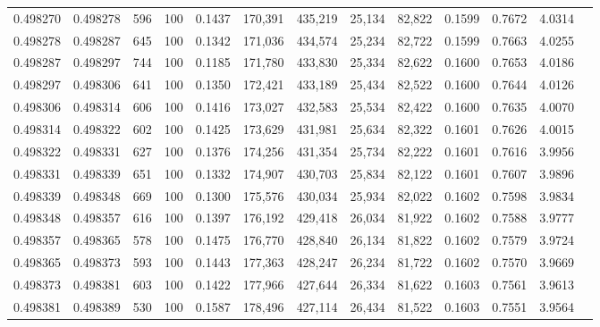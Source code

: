 \begin{tabular}{rrrrrrrrrrrrr}
0.498270 & 0.498278 &   596 & 100 &                                     0.1437 & 170,391 & 435,219 &  25,134 &  82,822 & 0.1599 & 0.7672 & 4.0314 \\
0.498278 & 0.498287 &   645 & 100 &                                     0.1342 & 171,036 & 434,574 &  25,234 &  82,722 & 0.1599 & 0.7663 & 4.0255 \\
0.498287 & 0.498297 &   744 & 100 &                                     0.1185 & 171,780 & 433,830 &  25,334 &  82,622 & 0.1600 & 0.7653 & 4.0186 \\
0.498297 & 0.498306 &   641 & 100 &                                     0.1350 & 172,421 & 433,189 &  25,434 &  82,522 & 0.1600 & 0.7644 & 4.0126 \\
0.498306 & 0.498314 &   606 & 100 &                                     0.1416 & 173,027 & 432,583 &  25,534 &  82,422 & 0.1600 & 0.7635 & 4.0070 \\
0.498314 & 0.498322 &   602 & 100 &                                     0.1425 & 173,629 & 431,981 &  25,634 &  82,322 & 0.1601 & 0.7626 & 4.0015 \\
0.498322 & 0.498331 &   627 & 100 &                                     0.1376 & 174,256 & 431,354 &  25,734 &  82,222 & 0.1601 & 0.7616 & 3.9956 \\
0.498331 & 0.498339 &   651 & 100 &                                     0.1332 & 174,907 & 430,703 &  25,834 &  82,122 & 0.1601 & 0.7607 & 3.9896 \\
0.498339 & 0.498348 &   669 & 100 &                                     0.1300 & 175,576 & 430,034 &  25,934 &  82,022 & 0.1602 & 0.7598 & 3.9834 \\
0.498348 & 0.498357 &   616 & 100 &                                     0.1397 & 176,192 & 429,418 &  26,034 &  81,922 & 0.1602 & 0.7588 & 3.9777 \\
0.498357 & 0.498365 &   578 & 100 &                                     0.1475 & 176,770 & 428,840 &  26,134 &  81,822 & 0.1602 & 0.7579 & 3.9724 \\
0.498365 & 0.498373 &   593 & 100 &                                     0.1443 & 177,363 & 428,247 &  26,234 &  81,722 & 0.1602 & 0.7570 & 3.9669 \\
0.498373 & 0.498381 &   603 & 100 &                                     0.1422 & 177,966 & 427,644 &  26,334 &  81,622 & 0.1603 & 0.7561 & 3.9613 \\
0.498381 & 0.498389 &   530 & 100 &                                     0.1587 & 178,496 & 427,114 &  26,434 &  81,522 & 0.1603 & 0.7551 & 3.9564 \\

\end{tabular}
